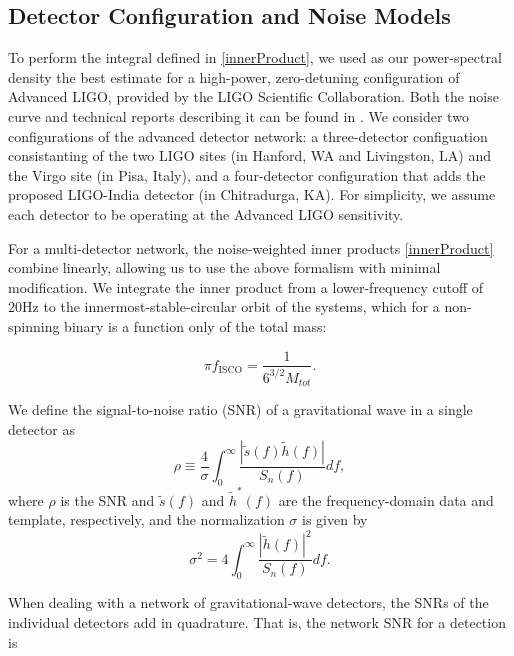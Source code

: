 \documentclass[11pt,a4paper]{emulateapj} 
\begin{document}
  \subsection{Detector Configuration and Noise Models}
  \label{detectorSection}
  
To perform the integral defined in \eqref{innerProduct}, we used as
our power-spectral density the best estimate for a high-power,
zero-detuning configuration of Advanced LIGO, provided by the LIGO
Scientific Collaboration.  Both the noise curve and technical reports
describing it can be found in \cite{ADVLIGONoise}.  We consider two
configurations of the advanced detector network: a three-detector
configuation consistanting of the two LIGO sites (in Hanford, WA and
Livingston, LA) and the Virgo site (in Pisa, Italy), and a
four-detector configuration that adds the proposed LIGO-India detector
(in Chitradurga, KA).  For simplicity, we assume each detector to be
operating at the Advanced LIGO sensitivity.


For a multi-detector network, the noise-weighted inner products
\eqref{innerProduct} combine linearly, allowing us to use the above
formalism with minimal modification.  We integrate the inner product
from a lower-frequency cutoff of $20\text{Hz}$ to the
innermost-stable-circular orbit of the systems, which for
a non-spinning binary is a function only of the total mass:

\begin{equation}
  \pi f_{\text{ISCO}} = \frac{1}{6^{3/2}M_{tot}}.
  \label{ISCOFrequency}
\end{equation}
   

We define the signal-to-noise ratio (SNR) of a gravitational wave in a
single detector as
\begin{equation}
  \rho \equiv \frac{4}{\sigma} \int^{\infty}_{0}\frac{|
    \tilde{s}(f)\tilde{h}(f)|}{S_{n}(f)}df,
  \label{formalSNR}
\end{equation}
where $\rho$ is the SNR and $\tilde s(f)$ and $\tilde{h}^{*}(f)$ are
the frequency-domain data and template, respectively, and the
normalization $\sigma$ is given by
\begin{equation}
  \sigma^2 = 4\int^{\infty}_{0}\frac{| \tilde{h}(f)|^2}{S_n(f)}df.
  \label{SNRnorm}
\end{equation}

\noindent When dealing with a network of gravitational-wave detectors, the SNRs
of the individual detectors add in quadrature.  That is, the network
SNR for a detection is
\end{document}
